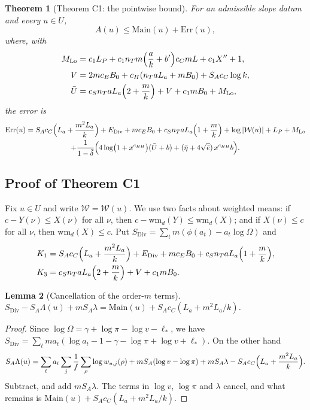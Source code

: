 \documentclass[11pt]{amsart}
\theoremstyle{plain}
\newtheorem{theorem}{Theorem}[section]
\newtheorem{lemma}[theorem]{Lemma}
\theoremstyle{definition}
\numberwithin{equation}{section}
\begin{document}
\begin{theorem}[Theorem C1: the pointwise bound]\label{thm:C1}
For an admissible slope datum and every $u\in U$,
\[
A(u)\le\mathrm{Main}(u)+\mathrm{Err}(u),
\]
where, with
\begin{align*}
M_{\mathrm{Lo}}&=c_1L_P+c_1n_Tm\Bigl(\frac ak+b'\Bigr)c_CmL+c_1X''+1,\\
V&=2mc_EB_0+c_H(n_TaL_a+mB_0)+S_Ac_C\log k,\\
\bar U&=c_Sn_TaL_a\Bigl(2+\frac mk\Bigr)+V+c_1mB_0+M_{\mathrm{Lo}},
\end{align*}
the error is
\begin{multline*}
\mathrm{Err}(u)=S_Ac_C\Bigl(L_a+\frac{m^2L_a}{k}\Bigr)+E_{\mathrm{Div}}+mc_EB_0+c_Sn_TaL_a\Bigl(1+\frac mk\Bigr)+\log|\mathcal W(u)|+L_P+M_{\mathrm{Lo}}\\
+\frac{1}{1-\bar\delta}\Bigl(4\log\bigl(1+x^{c_{HH}}\bigr)(\bar U+b)+(\bar\eta+4\sqrt{\bar e})\,x^{c_{HH}}b\Bigr).
\end{multline*}
\end{theorem}

\subsection{Proof of Theorem C1}

Fix $u\in U$ and write $\mathcal W=\mathcal W(u)$. We use two facts about weighted means: if
$c-Y(\nu)\le X(\nu)$ for all $\nu$, then $c-\mathrm{wm}_d(Y)\le\mathrm{wm}_d(X)$; and if
$X(\nu)\le c$ for all $\nu$, then $\mathrm{wm}_d(X)\le c$. Put
$S_{\mathrm{Div}}=\sum_tm(\phi(a_t)-a_t\log\Omega)$ and
\begin{align*}
K_1&=S_Ac_C\Bigl(L_a+\frac{m^2L_a}{k}\Bigr)+E_{\mathrm{Div}}+mc_EB_0+c_Sn_TaL_a\Bigl(1+\frac mk\Bigr),\\
K_3&=c_Sn_TaL_a\Bigl(2+\frac mk\Bigr)+V+c_1mB_0.
\end{align*}

\begin{lemma}[Cancellation of the order-$m$ terms]\label{lem:keyid}
$S_{\mathrm{Div}}-S_A\Lambda(u)+mS_A\lambda=\mathrm{Main}(u)+S_Ac_C(L_a+m^2L_a/k)$.
\end{lemma}

\begin{proof}
Since $\log\Omega=\gamma+\log\pi-\log v-\ell_\ast$, we have
$S_{\mathrm{Div}}=\sum_tma_t(\log a_t-1-\gamma-\log\pi+\log v+\ell_\ast)$. On the other hand
\[
S_A\Lambda(u)=\sum_ta_t\sum_j\frac1f\sum_\rho\log w_{u,j}(\rho)+mS_A(\log v-\log\pi)+mS_A\lambda-S_Ac_C\Bigl(L_a+\frac{m^2L_a}k\Bigr).
\]
Subtract, and add $mS_A\lambda$. The terms in $\log v$, $\log\pi$ and $\lambda$ cancel, and what
remains is $\mathrm{Main}(u)+S_Ac_C(L_a+m^2L_a/k)$.
\end{proof}
\end{document}
